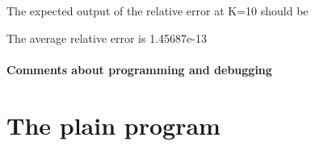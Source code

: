 {\ttfamily }

{\ttfamily The expected output of the relative error at K=10 should be}

{\ttfamily 
\begin{DoxyCode}
The average relative error is 1.45687e-13
\end{DoxyCode}
}

{\ttfamily \label{_Commentsaboutprogramminganddebugging}%
\paragraph*{Comments about programming and debugging }}

{\ttfamily }

{\ttfamily \label{_PlainProg}%
 \section*{The plain program}}

